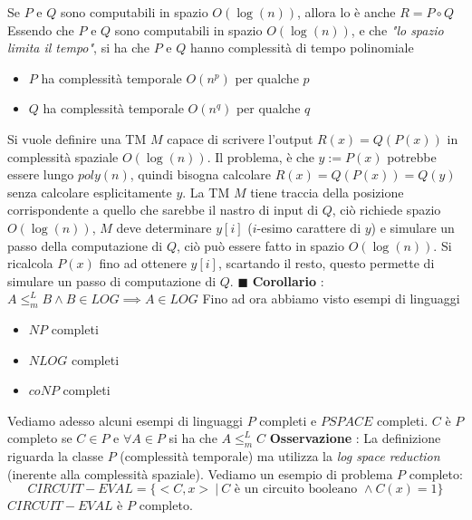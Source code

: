 \documentclass[10pt, letterpaper]{report}
\begin{document}
\teo{} Se $P$ e $Q$ sono computabili in spazio $O(\log(n))$, allora lo è anche $R=P\circ Q$\acc 
\dimo{} Essendo che $P$ e $Q$ sono computabili in spazio $O(\log(n))$, e che \textit{"lo spazio limita il tempo"}, si ha che $P$ e $Q$ hanno complessità di tempo polinomiale\begin{itemize}
    \item $P$ ha complessità temporale $O(n^p)$ per qualche $p$
    \item $Q$ ha complessità temporale $O(n^q)$ per qualche $q$
\end{itemize}
Si vuole definire una TM $M$ capace di scrivere l'output $R(x)=Q(P(x))$ in complessità spaziale $O(\log(n))$.\acc 
Il problema, è che $y:=P(x)$ potrebbe essere lungo $poly(n)$, quindi bisogna calcolare $R(x)=Q(P(x))=Q(y)$ senza calcolare esplicitamente $y$.\acc 
{}\acc 
La TM $M$ tiene traccia della posizione corrispondente a quello che sarebbe il nastro di input di $Q$, ciò richiede spazio $O(\log(n))$, $M$ deve determinare $y[i]$ ($i$-esimo carattere di $y$) e simulare un passo della computazione di $Q$, ciò può essere fatto in spazio $O(\log(n))$. \acc 
Si ricalcola $P(x)$ fino ad ottenere $y[i]$, scartando il resto, questo permette di simulare un passo di computazione di $Q$. \hfill$\blacksquare$\acc 
\textbf{Corollario} : $A\le_m^L B \land B \in LOG \implies A \in LOG$\acc 
Fino ad ora abbiamo visto esempi di linguaggi\begin{itemize}
    \item $NP$ completi
    \item $NLOG$ completi
    \item $coNP$ completi
\end{itemize}
Vediamo adesso alcuni esempi di linguaggi $P$ completi e $PSPACE$ completi.\acc 
{} $C$ è $P$ completo se $C\in P$ e $\forall A\in P$ si ha che $A\le_m^L C$\acc 
\textbf{Osservazione} : La definizione riguarda la classe $P$ (complessità temporale) ma utilizza la \textit{log space reduction} (inerente alla complessità spaziale).
Vediamo un esempio di problema $P$ completo: 
$$ CIRCUIT-EVAL=\{<C,x> \ | \ C\text{ è un circuito booleano }\land C(x)=1\}$$
\teo{} $CIRCUIT-EVAL$ è $P$ completo.\acc 
\dimo{} \acc 
\end{document}
